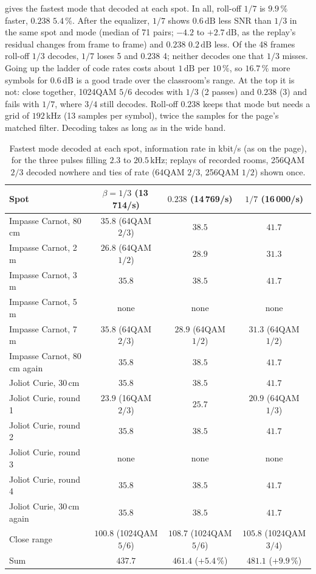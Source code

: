 \documentclass[11pt,a4paper]{article}
\newcommand{\kHz}{\,\mathrm{kHz}}
\newcommand{\dB}{\,\mathrm{dB}}
\theoremstyle{remark}
\begin{document}
 gives the fastest mode that decoded at each spot. In all, roll-off $1/7$ is $9.9\,\%$ faster, $0.238$ $5.4\,\%$. After the equalizer, $1/7$ shows $0.6\dB$ less SNR than $1/3$ in the same spot and mode (median of 71 pairs; $-4.2$ to $+2.7\dB$, as the replay's residual changes from frame to frame) and $0.238$ $0.2\dB$ less. Of the 48 frames roll-off $1/3$ decodes, $1/7$ loses 5 and $0.238$ 4; neither decodes one that $1/3$ misses. Going up the ladder of code rates costs about $1\dB$ per $10\,\%$, so $16.7\,\%$ more symbols for $0.6\dB$ is a good trade over the classroom's range. At the top it is not: close together, 1024QAM $5/6$ decodes with $1/3$ (2 passes) and $0.238$ (3) and fails with $1/7$, where $3/4$ still decodes. Roll-off $0.238$ keeps that mode but needs a grid of $192\kHz$ (13 samples per symbol), twice the samples for the page's matched filter. Decoding takes as long as in the wide band.

\begin{table}[ht]
\centering
\caption{Fastest mode decoded at each spot, information rate in kbit/s (as on the page), for the three pulses filling $2.3$ to $20.5\kHz$; replays of recorded rooms, 256QAM $2/3$ decoded nowhere and ties of rate (64QAM $2/3$, 256QAM $1/2$) shown once.}
\label{tab:scfast}
\small
\setlength{\tabcolsep}{4pt}
\begin{tabular}{lccc}
\toprule
Spot & $\beta = 1/3$ (13\,714/s) & $0.238$ (14\,769/s) & $1/7$ (16\,000/s)\\
\midrule
Impasse Carnot, 80\,cm & $35.8$ (64QAM $2/3$) & $38.5$ & $41.7$\\
Impasse Carnot, 2\,m & $26.8$ (64QAM $1/2$) & $28.9$ & $31.3$\\
Impasse Carnot, 3\,m & $35.8$ & $38.5$ & $41.7$\\
Impasse Carnot, 5\,m & none & none & none\\
Impasse Carnot, 7\,m & $35.8$ (64QAM $2/3$) & $28.9$ (64QAM $1/2$) & $31.3$ (64QAM $1/2$)\\
Impasse Carnot, 80\,cm again & $35.8$ & $38.5$ & $41.7$\\
Joliot Curie, 30\,cm & $35.8$ & $38.5$ & $41.7$\\
Joliot Curie, round 1 & $23.9$ (16QAM $2/3$) & $25.7$ & $20.9$ (64QAM $1/3$)\\
Joliot Curie, round 2 & $35.8$ & $38.5$ & $41.7$\\
Joliot Curie, round 3 & none & none & none\\
Joliot Curie, round 4 & $35.8$ & $38.5$ & $41.7$\\
Joliot Curie, 30\,cm again & $35.8$ & $38.5$ & $41.7$\\
Close range & $100.8$ (1024QAM $5/6$) & $108.7$ (1024QAM $5/6$) & $105.8$ (1024QAM $3/4$)\\
\midrule
Sum & $437.7$ & $461.4$ ($+5.4\,\%$) & $481.1$ ($+9.9\,\%$)\\
\bottomrule
\end{tabular}
\end{table}
\end{document}
